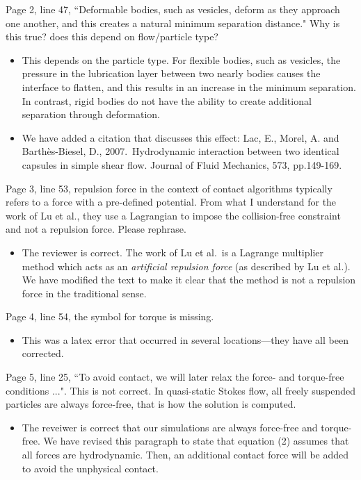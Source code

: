 \documentclass[11pt]{article}
\newcommand{\comment}[1]{{\color{blue} #1}}
\begin{document}
\noindent
\comment{Page 2, line 47, ``Deformable bodies, such as vesicles, deform as
they approach one another, and this creates a natural minimum separation
distance." Why is this true?  does this depend on flow/particle type?}
\begin{itemize}
  \item This depends on the particle type.  For flexible bodies, such as
    vesicles, the pressure in the lubrication layer between two nearly
    bodies causes the interface to flatten, and this results in an
    increase in the minimum separation.  In contrast, rigid bodies do
    not have the ability to create additional separation through
    deformation.

  \item We have added a citation that discusses this effect: \newline
    Lac, E., Morel, A. and Barthès-Biesel, D., 2007.~Hydrodynamic
    interaction between two identical capsules in simple shear flow.
    Journal of Fluid Mechanics, 573, pp.149-169.

\end{itemize}

\noindent
\comment{Page 3, line 53, repulsion force in the context of contact
  algorithms typically refers to a force with a pre-defined potential.
  From what I understand for the work of Lu et al., they use a
  Lagrangian to impose the collision-free constraint and not a repulsion
  force.  Please rephrase.}
\begin{itemize}
  \item The reviewer is correct.  The work of Lu et al.~is a Lagrange
    multiplier method which acts as an {\em artificial repulsion force}
    (as described by Lu et al.).  We have modified the text to make it
    clear that the method is not a repulsion force in the traditional
    sense.
\end{itemize}

\noindent
\comment{Page 4, line 54, the symbol for torque is missing.}
\begin{itemize}
  \item This was a latex error that occurred in several locations---they
    have all been corrected.
\end{itemize}

\noindent
\comment{Page 5, line 25, ``To avoid contact, we will later relax the
  force- and torque-free conditions ...".  This is not correct.  In
  quasi-static Stokes flow, all freely suspended particles are always
  force-free, that is how the solution is computed.}
\begin{itemize}
  \item The reveiwer is correct that our simulations are always
    force-free and torque-free.  We have revised this paragraph to state
    that equation (2) assumes that all forces are hydrodynamic.  Then,
    an additional contact force will be added to avoid the unphysical
    contact.
\end{itemize}
\end{document}
